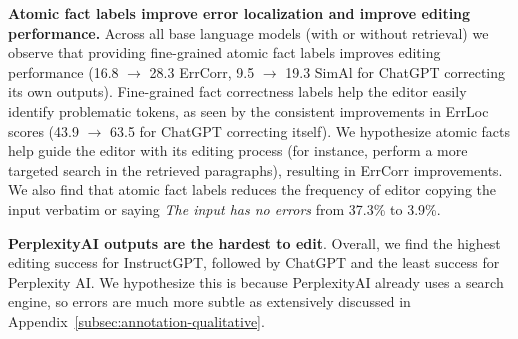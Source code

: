 \documentclass[11pt]{article}
\newcommand{\kalpesh}[1]{\textcolor{brown}{[Kalpesh: #1]}
}
\begin{document}
\vspace{.3em}

\noindent \textbf{Atomic fact labels improve error localization and improve editing performance.} Across all base language models (with or without retrieval) we observe that providing fine-grained atomic fact labels improves editing performance (16.8 $\rightarrow$ 28.3 ErrCorr, 9.5 $\rightarrow$ 19.3 SimAl for ChatGPT correcting its own outputs). Fine-grained fact correctness labels help the editor easily identify problematic tokens, as seen by the consistent improvements in ErrLoc scores (43.9 $\rightarrow$ 63.5 for ChatGPT correcting itself). We hypothesize atomic facts help guide the editor with its editing process (for instance, perform a more targeted search in the retrieved paragraphs), resulting in ErrCorr improvements. We also find that atomic fact labels reduces the frequency of editor copying the input verbatim or saying \emph{The input has no errors} from 37.3\% to 3.9\%.

\vspace{.3em}

\noindent \textbf{PerplexityAI outputs are the hardest to edit}. Overall, we find the highest editing success for InstructGPT, followed by ChatGPT and the least success for Perplexity AI. We hypothesize this is because PerplexityAI already uses a search engine, so errors are much more subtle as extensively discussed in Appendix~\ref{subsec:annotation-qualitative}.





%

\end{document}
